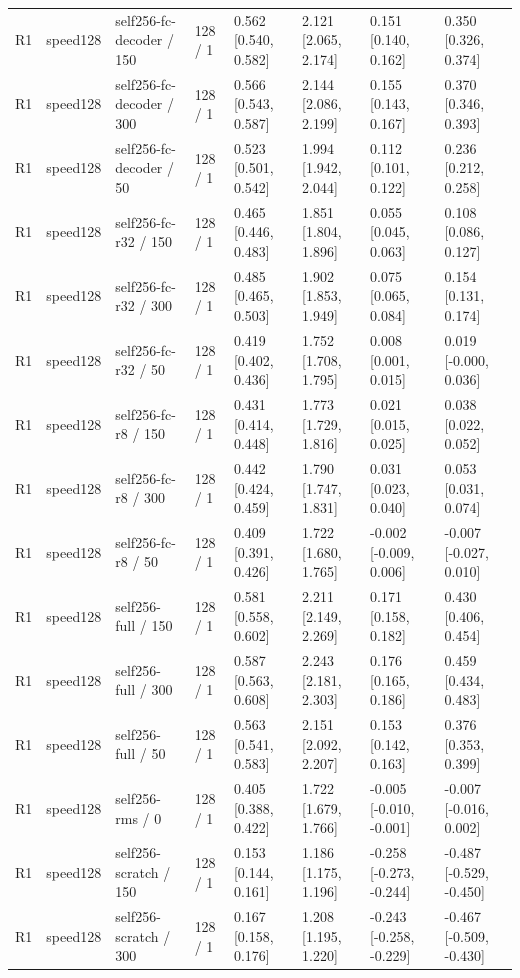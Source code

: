 \begin{tabular}{llllllll}
R1 & speed128 & self256-fc-decoder / 150 & 128 / 1 & 0.562 [0.540, 0.582] & 2.121 [2.065, 2.174] & 0.151 [0.140, 0.162] & 0.350 [0.326, 0.374] \\
R1 & speed128 & self256-fc-decoder / 300 & 128 / 1 & 0.566 [0.543, 0.587] & 2.144 [2.086, 2.199] & 0.155 [0.143, 0.167] & 0.370 [0.346, 0.393] \\
R1 & speed128 & self256-fc-decoder / 50 & 128 / 1 & 0.523 [0.501, 0.542] & 1.994 [1.942, 2.044] & 0.112 [0.101, 0.122] & 0.236 [0.212, 0.258] \\
R1 & speed128 & self256-fc-r32 / 150 & 128 / 1 & 0.465 [0.446, 0.483] & 1.851 [1.804, 1.896] & 0.055 [0.045, 0.063] & 0.108 [0.086, 0.127] \\
R1 & speed128 & self256-fc-r32 / 300 & 128 / 1 & 0.485 [0.465, 0.503] & 1.902 [1.853, 1.949] & 0.075 [0.065, 0.084] & 0.154 [0.131, 0.174] \\
R1 & speed128 & self256-fc-r32 / 50 & 128 / 1 & 0.419 [0.402, 0.436] & 1.752 [1.708, 1.795] & 0.008 [0.001, 0.015] & 0.019 [-0.000, 0.036] \\
R1 & speed128 & self256-fc-r8 / 150 & 128 / 1 & 0.431 [0.414, 0.448] & 1.773 [1.729, 1.816] & 0.021 [0.015, 0.025] & 0.038 [0.022, 0.052] \\
R1 & speed128 & self256-fc-r8 / 300 & 128 / 1 & 0.442 [0.424, 0.459] & 1.790 [1.747, 1.831] & 0.031 [0.023, 0.040] & 0.053 [0.031, 0.074] \\
R1 & speed128 & self256-fc-r8 / 50 & 128 / 1 & 0.409 [0.391, 0.426] & 1.722 [1.680, 1.765] & -0.002 [-0.009, 0.006] & -0.007 [-0.027, 0.010] \\
R1 & speed128 & self256-full / 150 & 128 / 1 & 0.581 [0.558, 0.602] & 2.211 [2.149, 2.269] & 0.171 [0.158, 0.182] & 0.430 [0.406, 0.454] \\
R1 & speed128 & self256-full / 300 & 128 / 1 & 0.587 [0.563, 0.608] & 2.243 [2.181, 2.303] & 0.176 [0.165, 0.186] & 0.459 [0.434, 0.483] \\
R1 & speed128 & self256-full / 50 & 128 / 1 & 0.563 [0.541, 0.583] & 2.151 [2.092, 2.207] & 0.153 [0.142, 0.163] & 0.376 [0.353, 0.399] \\
R1 & speed128 & self256-rms / 0 & 128 / 1 & 0.405 [0.388, 0.422] & 1.722 [1.679, 1.766] & -0.005 [-0.010, -0.001] & -0.007 [-0.016, 0.002] \\
R1 & speed128 & self256-scratch / 150 & 128 / 1 & 0.153 [0.144, 0.161] & 1.186 [1.175, 1.196] & -0.258 [-0.273, -0.244] & -0.487 [-0.529, -0.450] \\
R1 & speed128 & self256-scratch / 300 & 128 / 1 & 0.167 [0.158, 0.176] & 1.208 [1.195, 1.220] & -0.243 [-0.258, -0.229] & -0.467 [-0.509, -0.430] \\

\end{tabular}
